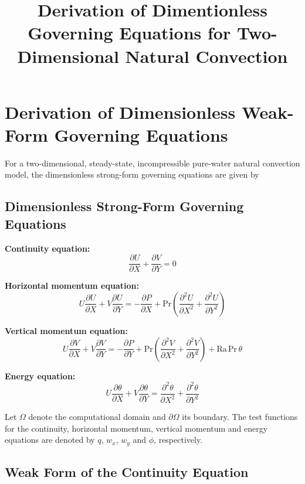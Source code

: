 \documentclass[preprint,3p,number]{elsarticle}
\title{Derivation of Dimentionless Governing Equations for Two-Dimensional Natural Convection}
\author{}
\date{}
\begin{document}
\maketitle

\section{Derivation of Dimensionless Weak-Form Governing Equations}

For a two-dimensional, steady-state, incompressible pure-water
natural convection model, the dimensionless strong-form governing
equations are given by

\subsection{Dimensionless Strong-Form Governing Equations}

\textbf{Continuity equation:}
\begin{equation}
\frac{\partial U}{\partial X}
+\frac{\partial V}{\partial Y}=0
\end{equation}

\textbf{Horizontal momentum equation:}
\begin{equation}
U\frac{\partial U}{\partial X}
+V\frac{\partial U}{\partial Y}
=-\frac{\partial P}{\partial X}
+\mathrm{Pr}\left(
\frac{\partial^2 U}{\partial X^2}
+\frac{\partial^2 U}{\partial Y^2}
\right)
\end{equation}

\textbf{Vertical momentum equation:}
\begin{equation}
U\frac{\partial V}{\partial X}
+V\frac{\partial V}{\partial Y}
=-\frac{\partial P}{\partial Y}
+\mathrm{Pr}\left(
\frac{\partial^2 V}{\partial X^2}
+\frac{\partial^2 V}{\partial Y^2}
\right)
+\mathrm{Ra}\,\mathrm{Pr}\,\theta
\end{equation}

\textbf{Energy equation:}
\begin{equation}
U\frac{\partial \theta}{\partial X}
+V\frac{\partial \theta}{\partial Y}
=\frac{\partial^2\theta}{\partial X^2}
+\frac{\partial^2\theta}{\partial Y^2}
\end{equation}

Let $\Omega$ denote the computational domain and
$\partial\Omega$ its boundary. The test functions for the
continuity, horizontal momentum, vertical momentum and energy
equations are denoted by $q$, $w_x$, $w_y$ and $\phi$,
respectively.

\subsection{Weak Form of the Continuity Equation}
\end{document}
